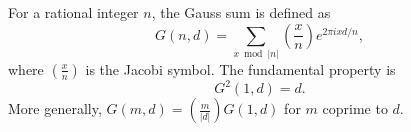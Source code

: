 For a rational integer $n$, the Gauss sum is defined as
$$G(n, d) = \sum_{x \bmod |n|} \left(\frac{x}{n}\right) e^{2\pi i x d / n},$$
where $\left(\frac{x}{n}\right)$ is the Jacobi symbol. The fundamental property is
$$G^2(1, d) = d.$$
More generally, $G(m, d) = \left(\frac{m}{|d|}\right) G(1, d)$ for $m$ coprime to $d$.
